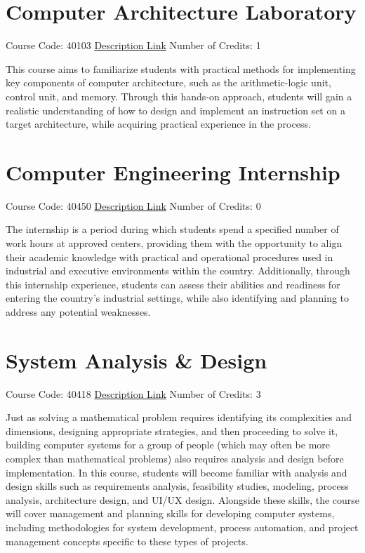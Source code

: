 \documentclass[
fontsize=11pt,
paper=a4,
parskip=half,
enlargefirstpage=off,    %
fromalign=right,        %
fromphone=on,           %
fromemail=on,
fromrule=off,           %
addrfield=off,          %
backaddress=on,         %
subject=beforeopening,  %
locfield=narrow,        %
foldmarks=off,          %
open=any
]{scrartcl}
\begin{document}
\section{Computer Architecture Laboratory}
Course Code: 40103 \qquad \quad \href{https://docs.ce.sharif.edu/course/40103}{Description Link}
\qquad \quad Number of Credits: 1

This course aims to familiarize students with practical methods for implementing key components of computer architecture, such as the arithmetic-logic unit, control unit, and memory. Through this hands-on approach, students will gain a realistic understanding of how to design and implement an instruction set on a target architecture, while acquiring practical experience in the process.

\section{Computer Engineering Internship}
Course Code: 40450 \qquad \quad \href{https://docs.ce.sharif.edu/course/40450}{Description Link}
\qquad \quad Number of Credits: 0

The internship is a period during which students spend a specified number of work hours at approved centers, providing them with the opportunity to align their academic knowledge with practical and operational procedures used in industrial and executive environments within the country. Additionally, through this internship experience, students can assess their abilities and readiness for entering the country's industrial settings, while also identifying and planning to address any potential weaknesses.

\section{System Analysis \& Design}
Course Code: 40418 \qquad \quad \href{https://docs.ce.sharif.edu/course/40418}{Description Link}
\qquad \quad Number of Credits: 3

Just as solving a mathematical problem requires identifying its complexities and dimensions, designing appropriate strategies, and then proceeding to solve it, building computer systems for a group of people (which may often be more complex than mathematical problems) also requires analysis and design before implementation. In this course, students will become familiar with analysis and design skills such as requirements analysis, feasibility studies, modeling, process analysis, architecture design, and UI/UX design. Alongside these skills, the course will cover management and planning skills for developing computer systems, including methodologies for system development, process automation, and project management concepts specific to these types of projects.
\end{document}

